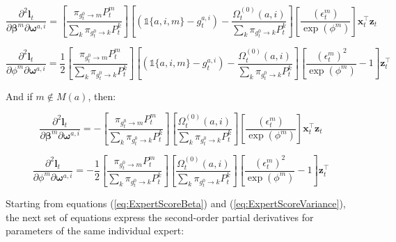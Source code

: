 \documentclass[12pt]{article}
\newcommand{\gateprod}[2]{\pi_{#1 \longrightarrow #2}}
\theoremstyle{definition}
\begin{document}
\begin{equation} 
  \frac{\partial^{2} \boldsymbol{l}_{t}}{\partial \boldsymbol{\beta}^{m} \partial \boldsymbol{\omega}^{a, i}} =  \left[ \frac{\gateprod{g^{0}_{t}}{m} P^{m}_{t}}{ \sum_{k} \gateprod{g^{0}_{t}}{k} P^{k}_{t}} \right]  \left[ \left( \mathbb{1}\{a, i, m\} - g^{a, i}_{t} \right)  - \frac{ \Omega^{(0)}_{t}(a, i) }{ \sum_{k} \gateprod{g^{0}_{t}}{k} P^{k}_{t} }  \right] \left[ \frac{ (\epsilon^{m}_{t}) }{\exp(\phi^{m})} \right] \boldsymbol{x}_{t}^{\top} \boldsymbol{z}_{t}  
\end{equation}

\begin{equation} 
  \frac{\partial^{2} \boldsymbol{l}_{t}}{\partial \phi^{m} \partial \boldsymbol{\omega}^{a, i}} =  \frac{1}{2} \left[ \frac{\gateprod{g^{0}_{t}}{m} P^{m}_{t}}{ \sum_{k} \gateprod{g^{0}_{t}}{k} P^{k}_{t}} \right]  \left[ \left( \mathbb{1}\{a, i, m\} - g^{a, i}_{t} \right)  - \frac{ \Omega^{(0)}_{t}(a, i) }{ \sum_{k} \gateprod{g^{0}_{t}}{k} P^{k}_{t} }  \right] \left[ \frac{ (\epsilon^{m}_{t})^{2} }{\exp(\phi^{m})} - 1 \right] \boldsymbol{z}_{t}^{\top} 
\end{equation}

And if $m \not\in M(a)$, then:

\begin{equation} 
  \frac{\partial^{2} \boldsymbol{l}_{t}}{\partial \boldsymbol{\beta}^{m} \partial \boldsymbol{\omega}^{a, i}} =  - \left[ \frac{\gateprod{g^{0}_{t}}{m} P^{m}_{t}}{ \sum_{k} \gateprod{g^{0}_{t}}{k} P^{k}_{t}} \right]  \left[ \frac{ \Omega^{(0)}_{t}(a, i) }{ \sum_{k} \gateprod{g^{0}_{t}}{k} P^{k}_{t} }  \right] \left[ \frac{ (\epsilon^{m}_{t}) }{\exp(\phi^{m})} \right] \boldsymbol{x}_{t}^{\top} \boldsymbol{z}_{t}  
\end{equation}

\begin{equation} 
  \frac{\partial^{2} \boldsymbol{l}_{t}}{\partial \phi^{m} \partial \boldsymbol{\omega}^{a, i}} =  - \frac{1}{2} \left[ \frac{\gateprod{g^{0}_{t}}{m} P^{m}_{t}}{ \sum_{k} \gateprod{g^{0}_{t}}{k} P^{k}_{t}} \right]  \left[ \frac{ \Omega^{(0)}_{t}(a, i) }{ \sum_{k} \gateprod{g^{0}_{t}}{k} P^{k}_{t} }  \right] \left[ \frac{ (\epsilon^{m}_{t})^{2} }{\exp(\phi^{m})} - 1 \right] \boldsymbol{z}_{t}^{\top} 
\end{equation}

Starting from equations (\ref{eq:ExpertScoreBeta}) and (\ref{eq:ExpertScoreVariance}),
the next set of equations express the second-order partial derivatives for parameters
of the same individual expert:
\end{document}
